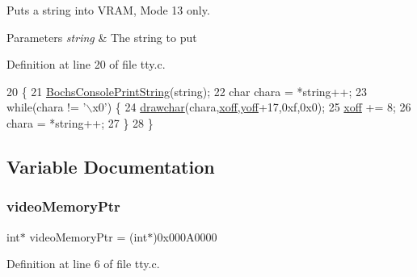 Puts a string into V\+R\+AM, Mode 13 only. 


\begin{DoxyParams}{Parameters}
{\em string} & The string to put \\
\hline
\end{DoxyParams}


Definition at line 20 of file tty.\+c.


\begin{DoxyCode}
20                                     \{
21     \hyperlink{a00041_a19e1f554d03c977f8b947f21489daa41_a19e1f554d03c977f8b947f21489daa41}{BochsConsolePrintString}(\textcolor{keywordtype}{string});
22     \textcolor{keywordtype}{char} chara = *\textcolor{keywordtype}{string}++;
23     \textcolor{keywordflow}{while}(chara != \textcolor{stringliteral}{'\(\backslash\)x0'}) \{
24         \hyperlink{a00026_a2c8df7a20b47341b70d97a7ff21d86ea_a2c8df7a20b47341b70d97a7ff21d86ea}{drawchar}(chara,\hyperlink{a00113_abaa0d20f0e52ce0d3a7d706f6ac16266_abaa0d20f0e52ce0d3a7d706f6ac16266}{xoff},\hyperlink{a00113_a1a7539764d0ae8cd06ce45c62cf92bca_a1a7539764d0ae8cd06ce45c62cf92bca}{yoff}+17,0xf,0x0);
25         \hyperlink{a00113_abaa0d20f0e52ce0d3a7d706f6ac16266_abaa0d20f0e52ce0d3a7d706f6ac16266}{xoff} += 8;
26         chara = *\textcolor{keywordtype}{string}++;
27     \}
28 \}
\end{DoxyCode}


\subsection{Variable Documentation}
\mbox{\label{a00113_a3f896e9c00b9302e2287aad054199134_a3f896e9c00b9302e2287aad054199134}} 
\subsubsection{\texorpdfstring{video\+Memory\+Ptr}{videoMemoryPtr}}
{\footnotesize\ttfamily int$\ast$ video\+Memory\+Ptr = (int$\ast$)0x000\+A0000}



Definition at line 6 of file tty.\+c.

\mbox{\label{a00113_abaa0d20f0e52ce0d3a7d706f6ac16266_abaa0d20f0e52ce0d3a7d706f6ac16266}} 
